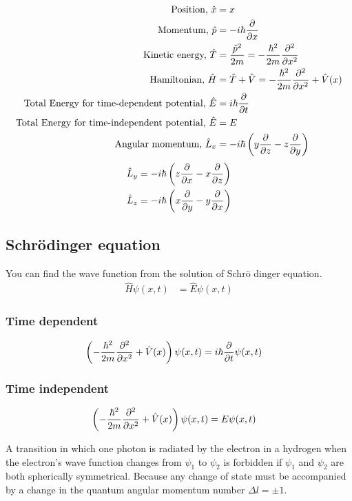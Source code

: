 \begin{align*}
\text{Position, } \hat{x} &= x \\ 
\text{Momentum, } \hat{p} &= -i\hbar\pdv{x} \\
\text{Kinetic energy, } \hat{T} &=  \frac{\hat{p}^{2}}{2m} = -\frac{\hbar^{2}}{2m} \pdv[2]{x}\\
\text{Hamiltonian, } \hat{H} &= \hat{T} + \hat{V} = -\frac{\hbar^{2}}{2m} \pdv[2]{x} + \hat{V}(x) \\
\text{Total Energy for time-dependent potential, } \hat{E} &= i\hbar \pdv{t}\\
\text{Total Energy for time-independent potential, } \hat{E} &= E \\
\text{Angular momentum, } \hat{L}_{x} &= -i\hbar \left( y\pdv{z} - z\pdv{y}\right)
\end{align*}
\begin{align*}
\hat{L}_{y} &= -i\hbar \left( z\pdv{x} - x\pdv{z}\right) \\
\hat{L}_{z} &= -i\hbar \left( x\pdv{y} - y\pdv{x}\right)
\end{align*}

\subsection{Schr\"odinger equation}
You can find the wave function from the solution of Schr\"o dinger equation.
\begin{align}
\hat{H} \psi(x,t) &= \hat{E} \psi(x,t)
\end{align}

\subsubsection{Time dependent}
\begin{align*}
\left(-\frac{\hbar^{2}}{2m} \pdv[2]{x} + \hat{V}(x)\right)\psi(x,t) &=  i\hbar \pdv{t}\psi(x,t)
\end{align*}

\subsubsection{Time independent}
\begin{align*}
\left(-\frac{\hbar^{2}}{2m} \pdv[2]{x} + \hat{V}(x)\right)\psi(x,t) &=  E\psi(x,t)
\end{align*}

A transition in which one photon is radiated by the electron in a hydrogen when the electron's wave function changes from $\psi_{1}$ to $\psi_{2}$ is forbidden if $\psi_{1}$ and $\psi_{2}$ are both spherically symmetrical. Because any change of state must be accompanied by a change in the quantum angular momentum number $\Delta l = \pm 1$.
